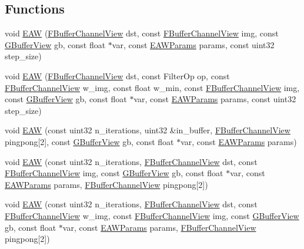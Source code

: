 \subsection*{Functions}
\begin{DoxyCompactItemize}
\item 
void \hyperlink{group___filtering_module_ga0ca4d81aa0d6833b3a0ecfdf891e03a6}{E\+AW} (\hyperlink{struct_f_buffer_channel_view}{F\+Buffer\+Channel\+View} dst, const \hyperlink{struct_f_buffer_channel_view}{F\+Buffer\+Channel\+View} img, const \hyperlink{struct_g_buffer_view}{G\+Buffer\+View} gb, const float $\ast$var, const \hyperlink{struct_e_a_w_params}{E\+A\+W\+Params} params, const uint32 step\+\_\+size)
\item 
void \hyperlink{group___filtering_module_ga8b74863fdff053bf5a4dae5222463b51}{E\+AW} (\hyperlink{struct_f_buffer_channel_view}{F\+Buffer\+Channel\+View} dst, const Filter\+Op op, const \hyperlink{struct_f_buffer_channel_view}{F\+Buffer\+Channel\+View} w\+\_\+img, const float w\+\_\+min, const \hyperlink{struct_f_buffer_channel_view}{F\+Buffer\+Channel\+View} img, const \hyperlink{struct_g_buffer_view}{G\+Buffer\+View} gb, const float $\ast$var, const \hyperlink{struct_e_a_w_params}{E\+A\+W\+Params} params, const uint32 step\+\_\+size)
\item 
void \hyperlink{group___filtering_module_gaf515a6c5c5019b5647219ad6566323e1}{E\+AW} (const uint32 n\+\_\+iterations, uint32 \&in\+\_\+buffer, \hyperlink{struct_f_buffer_channel_view}{F\+Buffer\+Channel\+View} pingpong\mbox{[}2\mbox{]}, const \hyperlink{struct_g_buffer_view}{G\+Buffer\+View} gb, const float $\ast$var, const \hyperlink{struct_e_a_w_params}{E\+A\+W\+Params} params)
\item 
void \hyperlink{group___filtering_module_ga55750da8e47a4f02c52581780d82b7be}{E\+AW} (const uint32 n\+\_\+iterations, \hyperlink{struct_f_buffer_channel_view}{F\+Buffer\+Channel\+View} dst, const \hyperlink{struct_f_buffer_channel_view}{F\+Buffer\+Channel\+View} img, const \hyperlink{struct_g_buffer_view}{G\+Buffer\+View} gb, const float $\ast$var, const \hyperlink{struct_e_a_w_params}{E\+A\+W\+Params} params, \hyperlink{struct_f_buffer_channel_view}{F\+Buffer\+Channel\+View} pingpong\mbox{[}2\mbox{]})
\item 
void \hyperlink{group___filtering_module_ga555e254676c54ef667565bdd2ca61860}{E\+AW} (const uint32 n\+\_\+iterations, \hyperlink{struct_f_buffer_channel_view}{F\+Buffer\+Channel\+View} dst, const \hyperlink{struct_f_buffer_channel_view}{F\+Buffer\+Channel\+View} w\+\_\+img, const \hyperlink{struct_f_buffer_channel_view}{F\+Buffer\+Channel\+View} img, const \hyperlink{struct_g_buffer_view}{G\+Buffer\+View} gb, const float $\ast$var, const \hyperlink{struct_e_a_w_params}{E\+A\+W\+Params} params, \hyperlink{struct_f_buffer_channel_view}{F\+Buffer\+Channel\+View} pingpong\mbox{[}2\mbox{]})

\end{DoxyCompactItemize}
